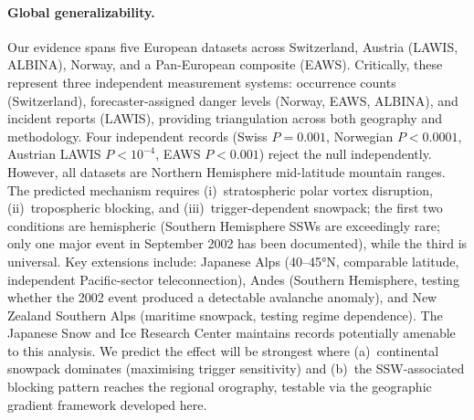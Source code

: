 \documentclass[11pt,letterpaper]{article}
\begin{document}
\paragraph{Global generalizability.} Our evidence spans five European datasets across Switzerland, Austria (LAWIS, ALBINA), Norway, and a Pan-European composite (EAWS). Critically, these represent three independent measurement systems: occurrence counts (Switzerland), forecaster-assigned danger levels (Norway, EAWS, ALBINA), and incident reports (LAWIS), providing triangulation across both geography and methodology. Four independent records (Swiss $P = 0.001$, Norwegian $P < 0.0001$, Austrian LAWIS $P < 10^{-4}$, EAWS $P < 0.001$) reject the null independently. However, all datasets are Northern Hemisphere mid-latitude mountain ranges. The predicted mechanism requires (i)~stratospheric polar vortex disruption, (ii)~tropospheric blocking, and (iii)~trigger-dependent snowpack; the first two conditions are hemispheric (Southern Hemisphere SSWs are exceedingly rare; only one major event in September 2002 has been documented\cite{Baldwin2021}), while the third is universal. Key extensions include: Japanese Alps (40--45°N, comparable latitude, independent Pacific-sector teleconnection), Andes (Southern Hemisphere, testing whether the 2002 event produced a detectable avalanche anomaly), and New Zealand Southern Alps (maritime snowpack, testing regime dependence). The Japanese Snow and Ice Research Center maintains records potentially amenable to this analysis. We predict the effect will be strongest where (a)~continental snowpack dominates (maximising trigger sensitivity) and (b)~the SSW-associated blocking pattern reaches the regional orography, testable via the geographic gradient framework developed here.
\end{document}
